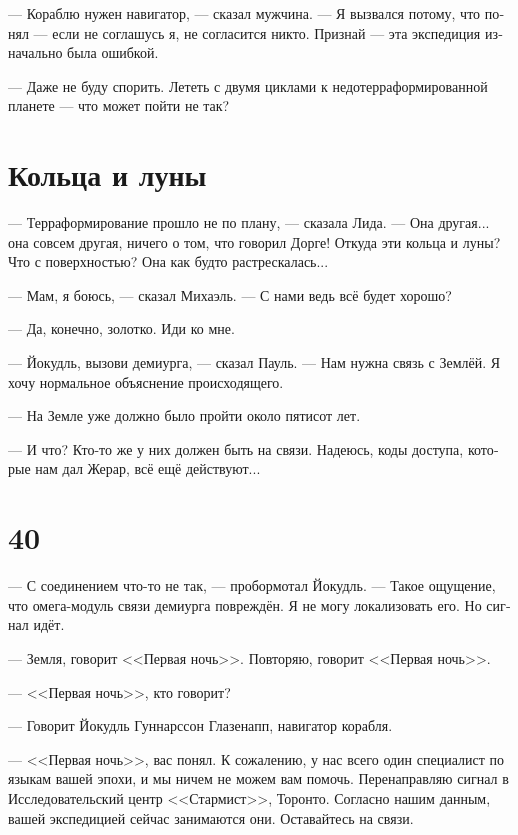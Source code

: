 \documentclass[a4paper,10pt,fleqn]{book}\usepackage{polyglossia}\setdefaultlanguage[babelshorthands=true]{russian}\setotherlanguage{english}\defaultfontfeatures{Ligatures=TeX,Mapping=tex-text}\usepackage{xcolor}\newcommand{\ml}[3]{#2}
\newcommand{\asterism}{\vspace{1em}{\centering\Large\bfseries$\ast~\ast~\ast$\par}\vspace{1em}}
\begin{document}
--- Кораблю нужен навигатор, --- сказал мужчина.
--- Я вызвался потому, что понял --- если не соглашусь я, не согласится никто.
\ml{$0$}
{Признай --- эта экспедиция изначально была ошибкой.}
{Admit it, this expedition was just a big mistake from the beginning.''}

\ml{$0$}
{--- Даже не буду спорить.}
{``I wouldn't argue with that.}
\ml{$0$}
{Лететь с двумя циклами к недотерраформированной планете --- что может пойти не так?}
{A two-cycle flight to the incompletely terraformed planet, what can go wrong?''}

\section{Кольца и луны}

--- Терраформирование прошло не по плану, --- сказала Лида.
--- Она другая... она совсем другая, ничего о том, что говорил Дорге!
Откуда эти кольца и луны?
Что с поверхностью?
Она как будто растрескалась...

--- Мам, я боюсь, --- сказал Михаэль.
--- С нами ведь всё будет хорошо?

--- Да, конечно, золотко.
Иди ко мне.

--- Йокудль, вызови демиурга, --- сказал Пауль.
--- Нам нужна связь с Землёй.
Я хочу нормальное объяснение происходящего.

--- На Земле уже должно было пройти около пятисот лет.

--- И что?
Кто-то же у них должен быть на связи.
Надеюсь, коды доступа, которые нам дал Жерар, всё ещё действуют...

\section{40}

--- С соединением что-то не так, --- пробормотал Йокудль.
--- Такое ощущение, что омега-модуль связи демиурга повреждён.
Я не могу локализовать его.
Но сигнал идёт.

\asterism

--- Земля, говорит <<Первая ночь>>.
Повторяю, говорит <<Первая ночь>>.

--- <<Первая ночь>>, кто говорит?

--- Говорит Йокудль Гуннарссон Глазенапп, навигатор корабля.

--- <<Первая ночь>>, вас понял.
К сожалению, у нас всего один специалист по языкам вашей эпохи, и мы ничем не можем вам помочь.
Перенаправляю сигнал в Исследовательский центр <<Стармист>>, Торонто.
Согласно нашим данным, вашей экспедицией сейчас занимаются они.
Оставайтесь на связи.
\end{document}
